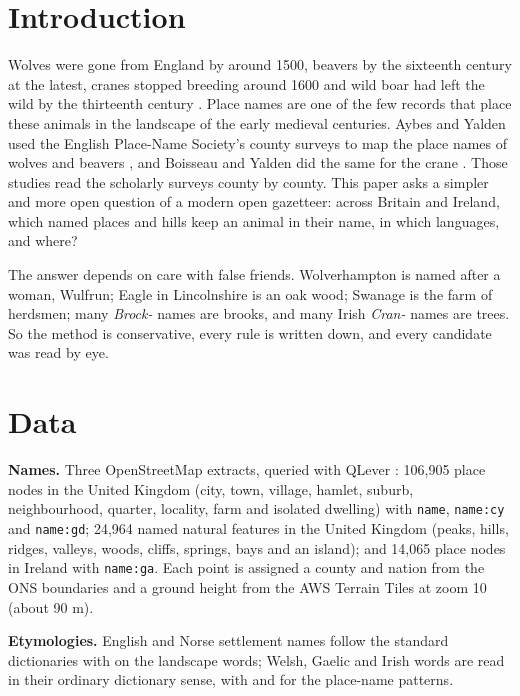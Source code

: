 \documentclass[11pt,a4paper]{article}
\begin{document}
\section{Introduction}
Wolves were gone from England by around 1500, beavers by the sixteenth century at the latest, cranes stopped breeding around 1600 and wild boar had left the wild by the thirteenth century \citep{yalden1999,coles2006,boisseau1998,pluskowski2006}. Place names are one of the few records that place these animals in the landscape of the early medieval centuries. Aybes and Yalden used the English Place-Name Society's county surveys to map the place names of wolves and beavers \citep{aybes1995}, and Boisseau and Yalden did the same for the crane \citep{boisseau1998}. Those studies read the scholarly surveys county by county. This paper asks a simpler and more open question of a modern open gazetteer: across Britain and Ireland, which named places and hills keep an animal in their name, in which languages, and where?

The answer depends on care with false friends. Wolverhampton is named after a woman, Wulfrun; Eagle in Lincolnshire is an oak wood; Swanage is the farm of herdsmen; many \textit{Brock-} names are brooks, and many Irish \textit{Cran-} names are trees. So the method is conservative, every rule is written down, and every candidate was read by eye.

\section{Data}
\textbf{Names.} Three OpenStreetMap extracts, queried with QLever \citep{bast2017}: 106,905 place nodes in the United Kingdom (city, town, village, hamlet, suburb, neighbourhood, quarter, locality, farm and isolated dwelling) with \texttt{name}, \texttt{name:cy} and \texttt{name:gd}; 24,964 named natural features in the United Kingdom (peaks, hills, ridges, valleys, woods, cliffs, springs, bays and an island); and 14,065 place nodes in Ireland with \texttt{name:ga}. Each point is assigned a county and nation from the ONS boundaries and a ground height from the AWS Terrain Tiles at zoom 10 (about 90 m).

\textbf{Etymologies.} English and Norse settlement names follow the standard dictionaries \citep{mills2011,watts2004,ekwall1960} with \citet{gelling2000} on the landscape words; Welsh, Gaelic and Irish words are read in their ordinary dictionary sense, with \citet{owen2007} and \citet{watson1926} for the place-name patterns.
\end{document}
